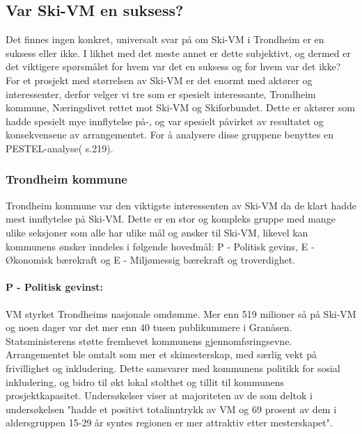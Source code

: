 \subsection{Var Ski-VM en suksess?}
Det finnes ingen konkret, universalt svar på om Ski-VM i Trondheim er en suksess eller ikke.  
I likhet med det meste annet er dette subjektivt, og dermed er det viktigere spørsmålet for hvem 
var det en suksess og for hvem var det ikke? For et prosjekt med størrelsen av Ski-VM er det 
enormt med aktører og interessenter, derfor velger vi tre som er spesielt interessante, 
Trondheim kommune, Næringslivet rettet mot Ski-VM og Skiforbundet. Dette er aktører som hadde 
spesielt mye innflytelse på-, og var spesielt påvirket av resultatet og konsekvensene av 
arrangementet. For å analysere disse gruppene benyttes en PESTEL-analyse(\cite{Teknologiledelse} s.219).

\subsubsection{Trondheim kommune}
Trondheim kommune var den viktigste interessenten av Ski-VM da de klart hadde mest 
innflytelse på Ski-VM. Dette er en stor og kompleks gruppe med mange ulike seksjoner som 
alle har ulike mål og ønsker til Ski-VM, likevel kan kommunens ønsker inndeles i 
følgende hovedmål: P - Politisk gevins, E - Økonomisk bærekraft og E - Miljømessig bærekraft og troverdighet.


\paragraph{P - Politisk gevinst:} VM styrket Trondheims nasjonale omdømme. Mer enn 519 milioner så på 
Ski-VM\cite{AftenpostenSeertall} og noen dager var det mer enn 40 tusen publikummere i 
Granåsen\cite{NRKFolkefest}. Statsministerens støtte fremhevet kommunens 
gjennomføringsevne\cite{Trondheim2025Midler}. 
Arrangementet ble omtalt som mer et skimesterskap, med særlig vekt på frivillighet og 
inkludering\cite{Trondheim2025Baerekraft}.  Dette samsvarer med kommunens politikk for sosial inkludering, 
og bidro til økt lokal stolthet og tillit til kommunens prosjektkapasitet. Undersøkelser viser
at majoriteten av de som deltok i undersøkelsen "hadde et positivt totalinntrykk av VM og 69 prosent 
av dem i aldersgruppen 15-29 år syntes regionen er mer attraktiv etter mesterskapet"\cite{AftenpostenNyVM}.

